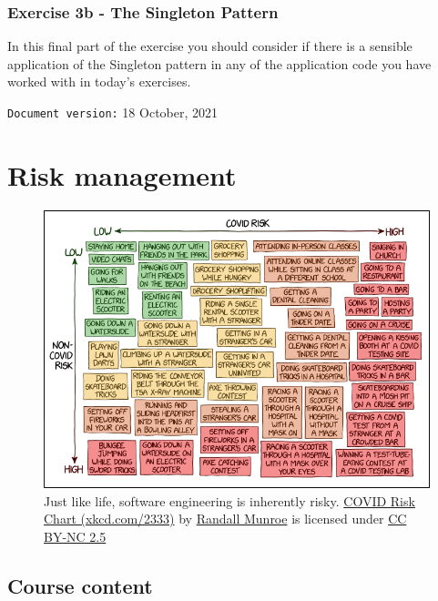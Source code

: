 \documentclass[
]{book}
\begin{document}
\hypertarget{singleton}{%
\subsection{Exercise 3b - The Singleton Pattern}\label{singleton}}

In this final part of the exercise you should consider if there is a sensible application of the Singleton pattern in any of the application code you have worked with in today's exercises.

\texttt{Document\ version:} 18 October, 2021

\hypertarget{risking}{%
\chapter{Risk management}\label{risking}}

\begin{figure}

{\centering \includegraphics[width=0.99\linewidth]{images/covid_risk_chart} 

}

\caption{Just like life, software engineering is inherently risky. \href{https://xkcd.com/2333/}{COVID Risk Chart (xkcd.com/2333)} by \href{https://en.wikipedia.org/wiki/Randall_Munroe}{Randall Munroe} is licensed under \href{https://creativecommons.org/licenses/by-nc/2.5/}{CC BY-NC 2.5}}\label{fig:xkcd-risk-fig}
\end{figure}



\hypertarget{course-content-2}{%
\section{Course content}\label{course-content-2}}
\end{document}

